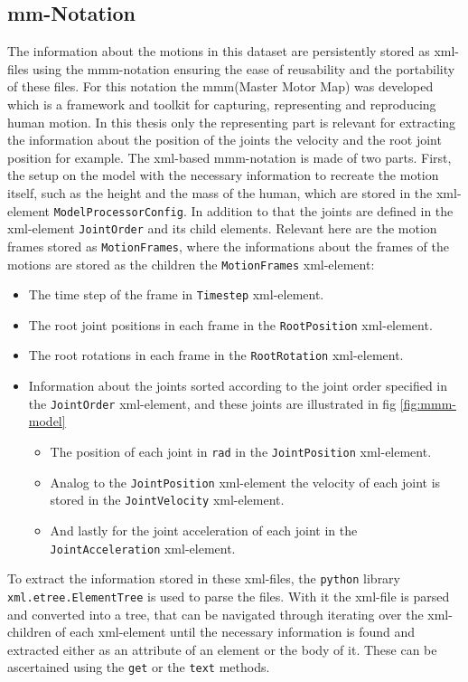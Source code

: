 \subsection{mm-Notation} \label{subsec:mmm-notation}
The information about the motions in this dataset are persistently stored as xml-files using the mmm-notation ensuring the ease of reusability and the portability of these files. For this notation the mmm(Master Motor Map) was developed which is a framework and toolkit for capturing, representing and reproducing human motion. In this thesis only the representing part is relevant for extracting the information about the position of the joints the velocity and the root joint position for example\cite{mmm2014}. The xml-based mmm-notation is made of two parts. First, the setup on the model with the necessary information to recreate the motion itself, such as the height and the mass of the human, which are stored in the xml-element \texttt{ModelProcessorConfig}. In addition to that the joints are defined in the xml-element \texttt{JointOrder} and its child elements. Relevant here are the motion frames stored as \texttt{MotionFrames}, where the informations about the frames of the motions are stored as the children the \texttt{MotionFrames} xml-element:
\begin{itemize}
	\item The time step of the frame in \texttt{Timestep} xml-element.
	\item The root joint positions in each frame in the \texttt{RootPosition} xml-element.
	\item The root rotations in each frame in the \texttt{RootRotation} xml-element.
	\item Information about the joints sorted according to the joint order specified in the \texttt{JointOrder} xml-element, and these joints are illustrated in fig \ref{fig:mmm-model}
	\begin{itemize}
		\item The position of each joint in \texttt{rad} in the \texttt{JointPosition} xml-element.
		\item Analog to the \texttt{JointPosition} xml-element the velocity of each joint is stored in the \texttt{JointVelocity} xml-element.
		\item And lastly for the joint acceleration of each joint in the \texttt{JointAcceleration} xml-element.
	\end{itemize}
\end{itemize}
To extract the information stored in these xml-files, the \texttt{python} library \texttt{xml.etree.ElementTree} is used to parse the files. With it the xml-file is parsed and converted into a tree, that can be navigated through iterating over the xml-children of each xml-element until the necessary information is found and extracted either as an attribute of an element or the body of it. These can be ascertained using the \texttt{get} or the \texttt{text} methods. 
